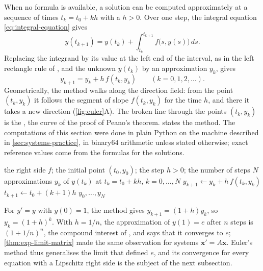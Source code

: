 When no formula is available, a solution can be computed approximately at a sequence of times $t_k=t_0+kh$ with a  $h>0$. Over one step, the integral equation \eqref{eq:integral-equation} gives
\[
y(t_{k+1})=y(t_k)+\int_{t_k}^{t_{k+1}}f\bigl(s,y(s)\bigr)\,ds .
\]
Replacing the integrand by its value at the left end of the interval, as in the left rectangle rule of , and the unknown $y(t_k)$ by an approximation $y_k$, gives 
\begin{equation}
y_{k+1}=y_k+h\,f(t_k,y_k)\qquad(k=0,1,2,\ldots).
\label{eq:euler-method}
\end{equation}
Geometrically, the method walks along the direction field: from the point $(t_k,y_k)$ it follows the segment of slope $f(t_k,y_k)$ for the time $h$, and there it takes a new direction (\cref{fig:euler}A). The broken line through the points $(t_k,y_k)$ is the , the curve of the proof of Peano's theorem.  states the method. The computations of this section were done in plain Python on the machine described in \cref{sec:systems-practice}, in binary64 arithmetic unless stated otherwise; exact reference values come from the formulas for the solutions.

\begin{algorithm}
\begin{algorithmic}[1]
\Require the right side $f$; the initial point $(t_0,y_0)$; the step $h>0$; the number of steps $N$
\Ensure approximations $y_k$ of $y(t_k)$ at $t_k=t_0+kh$, $k=0,\ldots,N$
  \State $y_{k+1}\gets y_k+h\,f(t_k,y_k)$ 
  \State $t_{k+1}\gets t_0+(k+1)h$
\EndFor
\State \Return $y_0,\ldots,y_N$
\end{algorithmic}
\caption{Euler's method for the initial value problem $y'=f(t,y)$, $y(t_0)=y_0$. Each step costs one evaluation of $f$. The times are computed as $t_0+(k+1)h$, which avoids the accumulation of rounding errors that repeated addition of $h$ would cause.\label{alg:euler}}
\end{algorithm}

For $y'=y$ with $y(0)=1$, the method gives $y_{k+1}=(1+h)y_k$, so $y_k=(1+h)^k$. With $h=1/n$, the approximation of $y(1)=e$ after $n$ steps is $(1+1/n)^n$, the compound interest of , and  says that it converges to $e$; \cref{thm:exp-limit-matrix} made the same observation for systems $\mathbf x'=A\mathbf x$. Euler's method thus generalises the limit that defined $e$, and its convergence for every equation with a Lipschitz right side is the subject of the next subsection.

